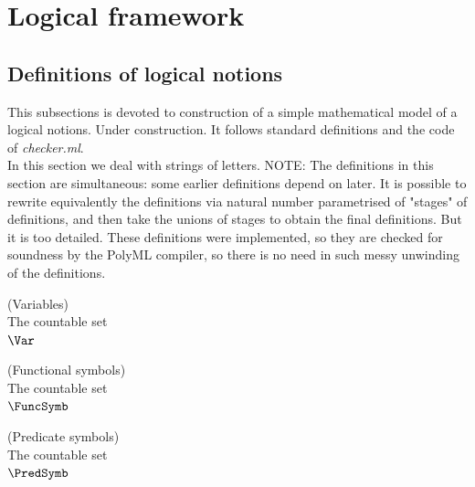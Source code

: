 \def\topic{}


\section{Logical framework}


\subsection{Definitions of logical notions}%

This subsections is devoted to construction of a simple mathematical model of a logical notions. Under construction. It follows standard definitions and the code of \textit{checker.ml}.\\

In this section we deal with strings of letters.
NOTE: The definitions in this section are simultaneous: some earlier definitions depend on later. It is possible to rewrite equivalently the definitions via natural number parametrised of "stages" of definitions, and then take the unions of stages to obtain the final definitions. But it is too detailed. These definitions were implemented, so they are checked for soundness by the PolyML compiler, so there is no need in such messy unwinding of the definitions.



\begin{definition}(Variables)\\
The countable set \\
$\Var$
\end{definition}

\begin{definition}(Functional symbols)\\
The countable set \\
$\FuncSymb$
\end{definition}

\begin{definition}(Predicate symbols)\\
The countable set \\
$\PredSymb$
\end{definition}

